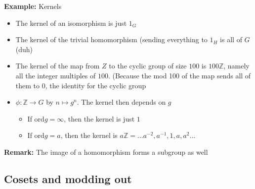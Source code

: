 \documentclass{article}
\newcommand{\Z}{\mathbb{Z}}
\begin{document}
\begin{example} 
\textbf{Example:} Kernels
\begin{itemize}
	\item The kernel of an isomorphism is just $1_G$
	\item The kernel of the trivial homomorphism (sending everything to $1_H$ is all of $G$ (duh)
	\item The kernel of the map from $Z$ to the cyclic group of size $100$ is $100\Z$, namely all the integer multiples of $100$. (Because the mod 100 of the map sends all of them to $0$, the identity for the cyclic group
	\item $\phi: \Z\to G$ by $n \mapsto g^n$. The kernel then depends on $g$
		\begin{itemize}
			\item If ord$g = \infty$, then the kernel is just $1$
			\item If ord$g = a$, then the kernel is $a\Z = {\ldots a^{-2}, a^{-1}, 1, a, a^2 \ldots}$
		\end{itemize}
\end{itemize}
\end{example}
\begin{remark} 
\textbf{Remark:}  
The image of a homomorphism forms a subgroup as well
\end{remark}

\subsection{Cosets and modding out}
\end{document}
